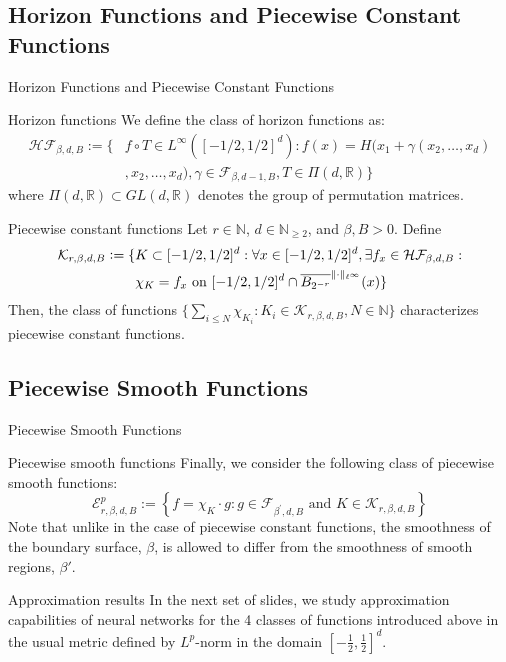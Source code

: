 \documentclass{if-beamer}
\newcommand{\defeq}{\vcentcolon=}
\begin{document}
\subsection{Horizon Functions and Piecewise Constant Functions}
\begin{frame}{Horizon Functions and Piecewise Constant Functions}
    \begin{block}{Horizon functions}
        {\small
        We define the class of horizon functions as:
        \begin{align*}
            \mathcal{H F}_{\beta, d, B} := \{&f \circ T \in L^{\infty}\left([-1 / 2,1 / 2]^{d}\right): f(x)=H(x_{1}+\gamma\left(x_{2}, \ldots, x_{d}\right)\\ &,x_{2}, \ldots, x_{d}), \gamma \in \mathcal{F}_{\beta, d-1, B}, T \in \Pi(d, \mathbb{R})\}
        \end{align*}
        where $\Pi(d, \mathbb{R}) \subset G L(d, \mathbb{R})$ denotes the group of permutation matrices.
        }
    \end{block}
    \begin{block}{Piecewise constant functions}
        {\small
        Let $r \in \mathbb{N}$, $d \in \mathbb{N}_{\geq 2}$, and $\beta, B>0$. Define 
        \begin{align*}
            \mathcal{K}_{r, \beta, d, B}\defeq\{&K \subset[-1 / 2,1 / 2]^{d}: \forall x \in[-1 / 2,1 / 2]^{d}, \exists f_{x} \in \mathcal{H} \mathcal{F}_{\beta, d, B}:\\ &\chi_{K}=f_{x} \text { on }[-1 / 2,1 / 2]^{d} \cap \overline{B_{2^{-r}}}^{\|\cdot\|_{\ell^{\infty}}}(x)\}
        \end{align*}
        Then, the class of functions $\{\sum_{i \leq N}\chi_{K_i} : K_i \in \mathcal{K}_{r, \beta, d, B}, N \in \mathbb{N}\}$ characterizes piecewise constant functions.
        }
    \end{block}
\end{frame}

\subsection{Piecewise Smooth Functions}
\begin{frame}{Piecewise Smooth Functions}
    \begin{block}{Piecewise smooth functions}
        Finally, we consider the following class of piecewise smooth functions:
        $$
        \mathcal{E}_{r, \beta, d, B}^{p}:=\left\{f=\chi_{K} \cdot g: g \in \mathcal{F}_{\beta^{\prime}, d, B} \text { and } K \in \mathcal{K}_{r, \beta, d, B}\right\}
        $$
        Note that unlike in the case of piecewise constant functions, the smoothness of the boundary surface, $\beta$, is allowed to differ from the smoothness of smooth regions, $\beta'$.
    \end{block}
    \begin{block}{Approximation results}
        In the next set of slides, we study approximation capabilities of neural networks for the 4 classes of functions introduced above in the usual metric defined by $L^p$-norm in the domain $\left[-\frac{1}{2}, \frac{1}{2}\right]^d$.
    \end{block}
\end{frame}
\end{document}
